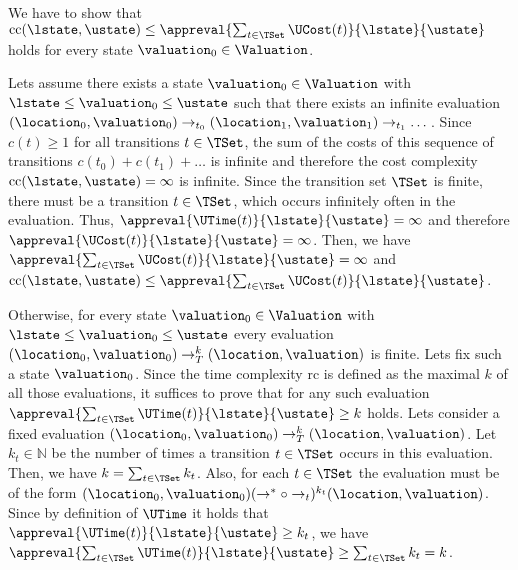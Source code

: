 We have to show that $\text{cc}(\lstate, \ustate) \leq \appreval{\sum_{t \in \TSet}\UCost(t)}{\lstate}{\ustate}$ holds for every state $\valuation_0 \in \Valuation$.

Lets assume there exists a state $\valuation_0 \in \Valuation$ with $\lstate \leq \valuation_0 \leq \ustate$ such that there exists an infinite evaluation $(\location_0, \valuation_0) \rightarrow_{t_0} (\location_1, \valuation_1) \rightarrow_{t_1} \dots$.
Since $c(t) \geq 1$ for all transitions $t \in \TSet$, the sum of the costs of this sequence of transitions $c(t_0) + c(t_1) + \dots$ is infinite and therefore the cost complexity $\text{cc}(\lstate, \ustate) = \infty$ is infinite.
Since the transition set $\TSet$ is finite, there must be a transition $t \in \TSet$, which occurs infinitely often in the evaluation.
Thus, $\appreval{\UTime(t)}{\lstate}{\ustate} = \infty$ and therefore $\appreval{\UCost(t)}{\lstate}{\ustate} = \infty$.
Then, we have $\appreval{\sum_{t \in \TSet}\UCost(t)}{\lstate}{\ustate} = \infty$ and $\text{cc}(\lstate, \ustate) \leq \appreval{\sum_{t \in \TSet}\UCost(t)}{\lstate}{\ustate}$.


Otherwise, for every state $\valuation_0 \in \Valuation$ with $\lstate \leq \valuation_0 \leq \ustate$ every evaluation $(\location_0, \valuation_0) \rightarrow^k_T (\location, \valuation)$ is finite.
Lets fix such a state $\valuation_0$.
Since the time complexity $\text{rc}$ is defined as the maximal $k$ of all those evaluations, it suffices to prove that for any such evaluation $\appreval{\sum_{t \in \TSet}\UTime(t)}{\lstate}{\ustate} \geq k$ holds.
Lets consider a fixed evaluation $(\location_0, \valuation_0) \rightarrow^k_T (\location, \valuation)$.
Let $k_t \in \mathbb{N}$ be the number of times a transition $t \in \TSet$ occurs in this evaluation.
Then, we have $k = \sum_{t \in \TSet} k_t$.
Also, for each $t \in \TSet$ the evaluation must be of the form $(\location_0, \valuation_0) (\rightarrow^* \circ \rightarrow_t)^{k_t} (\location, \valuation)$.
Since by definition of $\UTime$ it holds that $\appreval{\UTime(t)}{\lstate}{\ustate} \geq k_t$, we have $\appreval{\sum_{t \in \TSet}\UTime(t)}{\lstate}{\ustate} \geq \sum_{t \in \TSet} k_t = k$.
